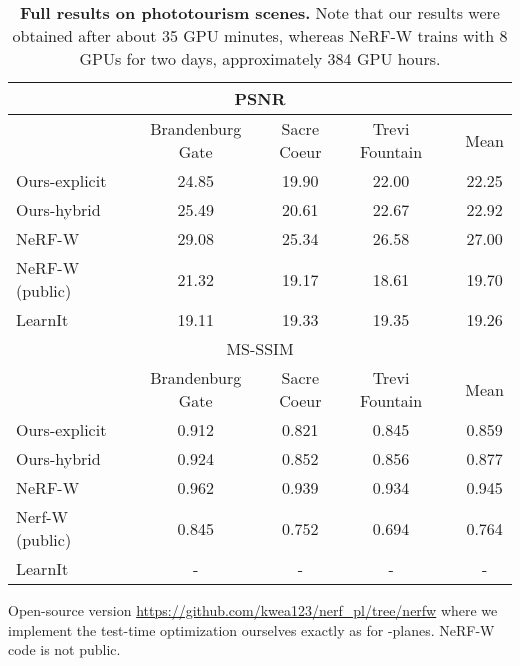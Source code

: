 \documentclass[10pt,twocolumn,letterpaper]{article}
\newcommand{\modelname}{-planes}
\begin{document}
\renewcommand{\tabcolsep}{6pt}
\begin{table*}
  \centering
  \begin{tabular}{llccclc}
    \multicolumn{7}{c}{PSNR } \\
    \toprule
     & & Brandenburg Gate & Sacre Coeur & Trevi Fountain & & Mean \\ 
     \cmidrule(){1-1} \cmidrule(){3-5} \cmidrule(){7-7}
     Ours-explicit && 24.85 & 19.90 & 22.00 && 22.25 \\
     Ours-hybrid && 25.49 & 20.61 & 22.67 && 22.92 \\
     NeRF-W~\cite{martinbrualla2020nerfw} && 29.08 & 25.34 & 26.58 && 27.00 \\
     NeRF-W (public) && 21.32 & 19.17 & 18.61 && 19.70 \\
     LearnIt \cite{learnit} && 19.11 & 19.33 & 19.35 && 19.26 \\
    \bottomrule 
    \multicolumn{7}{c}{MS-SSIM } \\
    \toprule
    & & Brandenburg Gate & Sacre Coeur & Trevi Fountain & & Mean \\ 
    \cmidrule(){1-1} \cmidrule(){3-5} \cmidrule(){7-7}
    Ours-explicit && 0.912 & 0.821 & 0.845 && 0.859 \\
    Ours-hybrid && 0.924 & 0.852 & 0.856 && 0.877 \\
    NeRF-W && 0.962 & 0.939 & 0.934 && 0.945 \\
    Nerf-W (public) && 0.845 & 0.752 & 0.694 && 0.764 \\
    LearnIt && - & - & - && - \\ \bottomrule 

    
  \end{tabular}
    \vspace{-0.1cm}
    \begin{flushleft}
  {\footnotesize  Open-source version \url{https://github.com/kwea123/nerf_pl/tree/nerfw} where we implement the test-time optimization ourselves exactly as for \modelname{}. NeRF-W code is not public.}
  \end{flushleft}
  \vspace{-0.4cm}
  \caption{\textbf{Full results on phototourism scenes.} Note that our results were obtained after about 35 GPU minutes, whereas NeRF-W trains with 8 GPUs for two days, approximately 384 GPU hours. }
  \label{tab:fullphototourism}
\end{table*}
 
\end{document}
